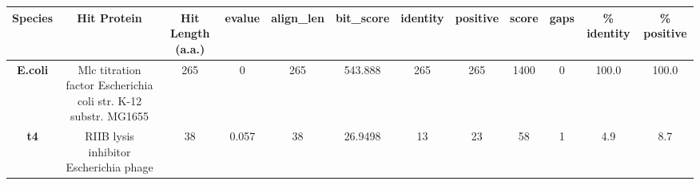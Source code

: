 \begin{tabular}{|c|c|c|c|c|c|c|c|c|c|c|c|} \hline
\textbf{Species} & \textbf{Hit Protein} & \textbf{Hit Length (a.a.)} & \textbf{evalue} & \textbf{align\_len} & \textbf{bit\_score} & \textbf{identity} & \textbf{positive} & \textbf{score} & \textbf{gaps} & \textbf{\% identity} & \textbf{\% positive} \\ \hline
\textbf{E.coli} & Mlc titration factor Escherichia coli str. K-12 substr. MG1655 & 265 & 0 & 265 & 543.888 & 265 & 265 & 1400 & 0 & 100.0 & 100.0\\
\textbf{t4} & RIIB lysis inhibitor Escherichia phage  & 38 & 0.057 & 38 & 26.9498 & 13 & 23 & 58 & 1 & 4.9 & 8.7\\
\hline \end{tabular}
